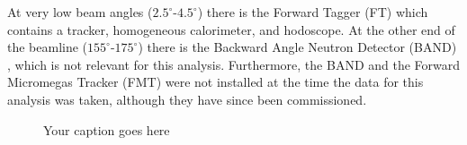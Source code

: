     At very low beam angles ($2.5^{\circ}$-$4.5^{\circ}$) there is the Forward Tagger (FT) \parencite{Acker2020TheTagger} which contains a tracker, homogeneous calorimeter, and hodoscope. At the other end of the beamline ($155^{\circ}$-$175^{\circ}$) there is the Backward Angle Neutron Detector (BAND)  \parencite{Segarra2020TheBAND}, which is not relevant for this analysis. Furthermore, the BAND and the Forward Micromegas Tracker (FMT)  \parencite{Acker2020TheTracker} were not installed at the time the data for this analysis was taken, although they have since been commissioned. 
    
    

\iffalse

    \begin{figure}[H]
        \centering
        \hfill
        \hfill
        \caption{Your caption goes here}
        \label{fig:others}
    \end{figure}

